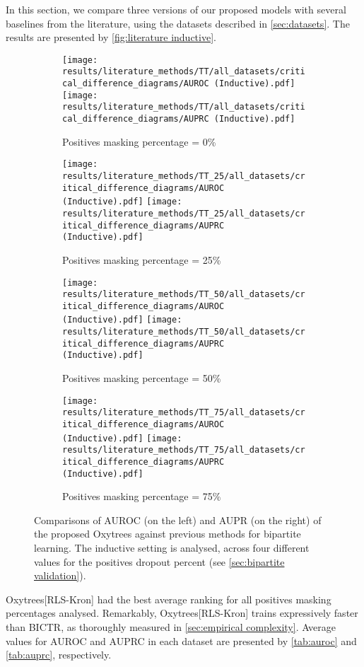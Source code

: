 \documentclass[sn-mathphys-num]{sn-jnl}%
\theoremstyle{thmstyleone}%
\theoremstyle{thmstyletwo}%
\theoremstyle{thmstylethree}%
\begin{document}
In this section, we compare three versions of our proposed models with several baselines from the literature, using the datasets described in \autoref{sec:datasets}. The results are presented by \autoref{fig:literature inductive}.
%
\begin{figure}[tbh]
    \centering
    \begin{subfigure}{\textwidth}
        \texttt{[image: results/literature\_methods/TT/all\_datasets/critical\_difference\_diagrams/AUROC (Inductive).pdf]}
        \hfill
        \texttt{[image: results/literature\_methods/TT/all\_datasets/critical\_difference\_diagrams/AUPRC (Inductive).pdf]}
        \caption{Positives masking percentage = 0\%}
    \end{subfigure}
    
    \begin{subfigure}{\textwidth}
        \texttt{[image: results/literature\_methods/TT\_25/all\_datasets/critical\_difference\_diagrams/AUROC (Inductive).pdf]}
        \hfill
        \texttt{[image: results/literature\_methods/TT\_25/all\_datasets/critical\_difference\_diagrams/AUPRC (Inductive).pdf]}
        \caption{Positives masking percentage = 25\%}
    \end{subfigure}
    
    \begin{subfigure}{\textwidth}
        \texttt{[image: results/literature\_methods/TT\_50/all\_datasets/critical\_difference\_diagrams/AUROC (Inductive).pdf]}
        \hfill
        \texttt{[image: results/literature\_methods/TT\_50/all\_datasets/critical\_difference\_diagrams/AUPRC (Inductive).pdf]}
        \caption{Positives masking percentage = 50\%}
    \end{subfigure}
    
    \begin{subfigure}{\textwidth}
        \texttt{[image: results/literature\_methods/TT\_75/all\_datasets/critical\_difference\_diagrams/AUROC (Inductive).pdf]}
        \hfill
        \texttt{[image: results/literature\_methods/TT\_75/all\_datasets/critical\_difference\_diagrams/AUPRC (Inductive).pdf]}
        \caption{Positives masking percentage = 75\%}
    \end{subfigure}   

    \caption{Comparisons of AUROC (on the left) and AUPR (on the right) of the proposed Oxytrees against previous methods for bipartite learning. The inductive setting is analysed, across four different values for the positives dropout percent (see \autoref{sec:bipartite validation}).
    }
    \label{fig:literature inductive}
\end{figure}
%
Oxytrees[RLS-Kron] had the best average ranking for all positives masking percentages analysed.
Remarkably, Oxytrees[RLS-Kron] trains expressively faster than BICTR, as thoroughly measured in \autoref{sec:empirical complexity}.
Average values for AUROC and AUPRC in each dataset are presented by \autoref{tab:auroc} and \autoref{tab:auprc}, respectively.
\end{document}
